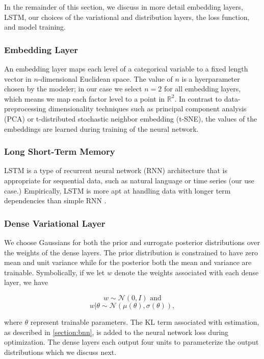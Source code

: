 \documentclass{article}
\begin{document}
In the remainder of this section, we discuss in more detail embedding layers, LSTM, our choices of the variational and distribution layers, the loss function, and model training.

\subsubsection{Embedding Layer}

An embedding layer maps each level of a categorical variable to a fixed length vector in $n$-dimensional Euclidean space. The value of $n$ is a hyerparameter chosen by the modeler; in our case we select $n = 2$ for all embedding layers, which means we map each factor level to a point in $\mathbb{R}^2$. In contrast to data-preprocessing dimensionality techniques such as principal component analysis (PCA) or t-distributed stochastic neighbor embedding (t-SNE), the values of the embeddings are learned during training of the neural network.

\subsubsection{Long Short-Term Memory}

LSTM is a type of recurrent neural network (RNN) architecture that is appropriate for sequential data, such as natural language or time series (our use case.) Empirically, LSTM is more apt at handling data with longer term dependencies than simple RNN \cite{lecun2015deep}.

\subsubsection{Dense Variational Layer}

We choose Gaussians for both the prior and surrogate posterior distributions over the weights of the dense layers. The prior distribution is constrained to have zero mean and unit variance while for the posterior both the mean and variance are trainable. Symbolically, if we let $w$ denote the weights associated with each dense layer, we have

\begin{equation}
    w \sim \mathcal{N}(0, I) \text{ and}
\end{equation}
\begin{equation}
    w|\theta \sim \mathcal{N}(\mu(\theta), \sigma(\theta)),
\end{equation}

where $\theta$ represent trainable parameters. The KL term associated with estimation, as described in \ref{section:bnn}, is added to the neural network loss during optimization. The dense layers each output four units to parameterize the output distributions which we discuss next.
\end{document}
